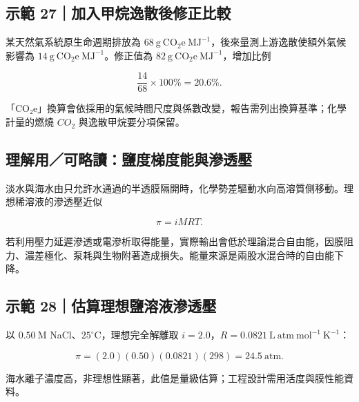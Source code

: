 \documentclass[11pt,a4paper]{article}
\begin{document}
\begin{HandoutWorkedExample}

\subsection{示範 27｜加入甲烷逸散後修正比較}\label{ux793aux7bc4-27ux52a0ux5165ux7532ux70f7ux9038ux6563ux5f8cux4feeux6b63ux6bd4ux8f03}

某天然氣系統原生命週期排放為 \(68\ \mathrm{g\ CO_2e\ MJ^{-1}}\)，後來量測上游逸散使額外氣候影響為 \(14\ \mathrm{g\ CO_2e\ MJ^{-1}}\)。修正值為 \(82\ \mathrm{g\ CO_2e\ MJ^{-1}}\)，增加比例

\[
\frac{14}{68}\times100\%=20.6\%.
\]

「CO₂e」換算會依採用的氣候時間尺度與係數改變，報告需列出換算基準；化學計量的燃燒 \(CO_2\) 與逸散甲烷要分項保留。

\end{HandoutWorkedExample}

\subsection{理解用／可略讀：鹽度梯度能與滲透壓}\label{ux7406ux89e3ux7528ux53efux7565ux8b80ux9e7dux5ea6ux68afux5ea6ux80fdux8207ux6ef2ux900fux58d3}

淡水與海水由只允許水通過的半透膜隔開時，化學勢差驅動水向高溶質側移動。理想稀溶液的滲透壓近似

\[
\pi=iMRT.
\]

若利用壓力延遲滲透或電滲析取得能量，實際輸出會低於理論混合自由能，因膜阻力、濃差極化、泵耗與生物附著造成損失。能量來源是兩股水混合時的自由能下降。

\begin{HandoutWorkedExample}

\subsection{示範 28｜估算理想鹽溶液滲透壓}\label{ux793aux7bc4-28ux4f30ux7b97ux7406ux60f3ux9e7dux6eb6ux6db2ux6ef2ux900fux58d3}

以 \(0.50\ \mathrm M\) NaCl、\(25^\circ\mathrm C\)，理想完全解離取 \(i=2.0\)，\(R=0.0821\ \mathrm{L\ atm\ mol^{-1}\ K^{-1}}\)：

\[
\pi=(2.0)(0.50)(0.0821)(298)=24.5\ \mathrm{atm}.
\]

海水離子濃度高，非理想性顯著，此值是量級估算；工程設計需用活度與膜性能資料。

\end{HandoutWorkedExample}
\end{document}
